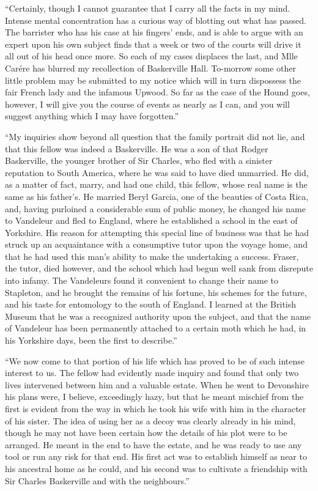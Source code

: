 \documentclass[paper=a5,BCOR=7mm,twoside,DIV=calc,12pt,usegeometry,openany,chapterprefix,endperiod,headings=big]{scrbook} %
\begin{document}
\enquote{Certainly, though I cannot guarantee that I carry all the facts in my mind. Intense mental concentration has a curious way of blotting out what has passed. The barrister who has his case at his fingers' ends, and is able to argue with an expert upon his own subject finds that a week or two of the courts will drive it all out of his head once more. So each of my cases displaces the last, and Mlle Carére has blurred my recollection of Baskerville Hall. To-morrow some other little problem may be submitted to my notice which will in turn dispossess the fair French lady and the infamous Upwood. So far as the case of the Hound goes, however, I will give you the course of events as nearly as I can, and you will suggest anything which I may have forgotten.}

\enquote{My inquiries show beyond all question that the family portrait did not lie, and that this fellow was indeed a Baskerville. He was a son of that Rodger Baskerville, the younger brother of Sir Charles, who fled with a sinister reputation to South America, where he was said to have died unmarried. He did, as a matter of fact, marry, and had one child, this fellow, whose real name is the same as his father's. He married Beryl Garcia, one of the beauties of Costa Rica, and, having purloined a considerable sum of public money, he changed his name to Vandeleur and fled to England, where he established a school in the east of Yorkshire. His reason for attempting this special line of business was that he had struck up an acquaintance with a consumptive tutor upon the voyage home, and that he had used this man's ability to make the undertaking a success. Fraser, the tutor, died however, and the school which had begun well sank from disrepute into infamy. The Vandeleurs found it convenient to change their name to Stapleton, and he brought the remains of his fortune, his schemes for the future, and his taste for entomology to the south of England. I learned at the British Museum that he was a recognized authority upon the subject, and that the name of Vandeleur has been permanently attached to a certain moth which he had, in his Yorkshire days, been the first to describe.}

\enquote{We now come to that portion of his life which has proved to be of such intense interest to us. The fellow had evidently made inquiry and found that only two lives intervened between him and a valuable estate. When he went to Devonshire his plans were, I believe, exceedingly hazy, but that he meant mischief from the first is evident from the way in which he took his wife with him in the character of his sister. The idea of using her as a decoy was clearly already in his mind, though he may not have been certain how the details of his plot were to be arranged. He meant in the end to have the estate, and he was ready to use any tool or run any risk for that end. His first act was to establish himself as near to his ancestral home as he could, and his second was to cultivate a friendship with Sir Charles Baskerville and with the neighbours.}
\end{document}
